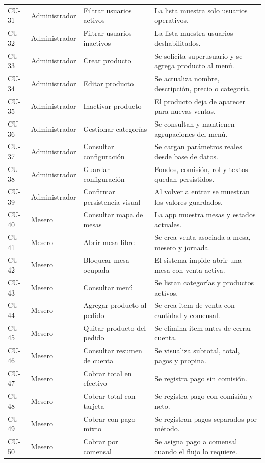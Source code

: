 \documentclass[11pt,letterpaper,openany]{report}
\begin{document}
{\begin{longtable}{p{}p{}p{}p{}}
CU-31 & Administrador & Filtrar usuarios activos & La lista muestra solo usuarios operativos.\\
CU-32 & Administrador & Filtrar usuarios inactivos & La lista muestra usuarios deshabilitados.\\
CU-33 & Administrador & Crear producto & Se solicita superusuario y se agrega producto al menú.\\
CU-34 & Administrador & Editar producto & Se actualiza nombre, descripción, precio o categoría.\\
CU-35 & Administrador & Inactivar producto & El producto deja de aparecer para nuevas ventas.\\
CU-36 & Administrador & Gestionar categorías & Se consultan y mantienen agrupaciones del menú.\\
CU-37 & Administrador & Consultar configuración & Se cargan parámetros reales desde base de datos.\\
CU-38 & Administrador & Guardar configuración & Fondos, comisión, rol y textos quedan persistidos.\\
CU-39 & Administrador & Confirmar persistencia visual & Al volver a entrar se muestran los valores guardados.\\
CU-40 & Mesero & Consultar mapa de mesas & La app muestra mesas y estados actuales.\\
CU-41 & Mesero & Abrir mesa libre & Se crea venta asociada a mesa, mesero y jornada.\\
CU-42 & Mesero & Bloquear mesa ocupada & El sistema impide abrir una mesa con venta activa.\\
CU-43 & Mesero & Consultar menú & Se listan categorías y productos activos.\\
CU-44 & Mesero & Agregar producto al pedido & Se crea item de venta con cantidad y comensal.\\
CU-45 & Mesero & Quitar producto del pedido & Se elimina item antes de cerrar cuenta.\\
CU-46 & Mesero & Consultar resumen de cuenta & Se visualiza subtotal, total, pagos y propina.\\
CU-47 & Mesero & Cobrar total en efectivo & Se registra pago sin comisión.\\
CU-48 & Mesero & Cobrar total con tarjeta & Se registra pago con comisión y neto.\\
CU-49 & Mesero & Cobrar con pago mixto & Se registran pagos separados por método.\\
CU-50 & Mesero & Cobrar por comensal & Se asigna pago a comensal cuando el flujo lo requiere.\\

\end{longtable}}
\end{document}
